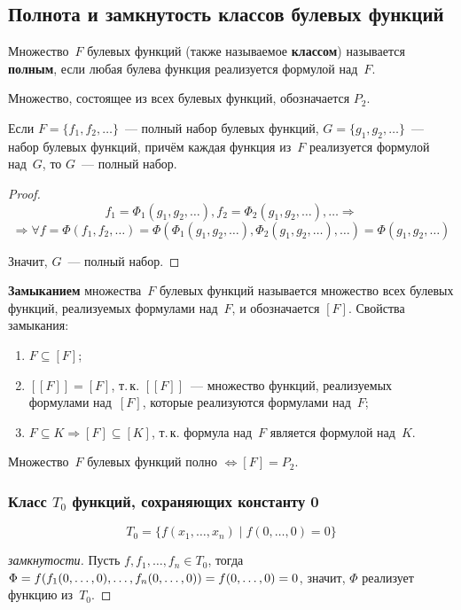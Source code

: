 \subsection{Полнота и замкнутость классов булевых функций}
Множество~$F$ булевых функций (также называемое \textbf{классом}) называется \textbf{полным}, если любая булева функция реализуется формулой над~$F$.

Множество, состоящее из всех булевых функций, обозначается $P_2$.

\begin{theorem}
Если $F = \{ f_1, f_2, \ldots \}$~--- полный набор булевых функций, $G = \{ g_1, g_2, \ldots \}$~--- набор булевых функций, причём каждая функция из~$F$ реализуется формулой над~$G$, то $G$~--- полный набор.
\end{theorem}
\begin{proof}
\begin{equation*}
f_1 = \Phi_1(g_1, g_2, \ldots), f_2 = \Phi_2(g_1, g_2, \ldots), \ldots \Rightarrow
\end{equation*}
\begin{equation*}
\Rightarrow \forall f = \Phi(f_1, f_2, \ldots) =
\Phi(\Phi_1(g_1, g_2, \ldots), \Phi_2(g_1, g_2, \ldots), \ldots) =
\Phi(g_1, g_2, \ldots)
\end{equation*}

Значит, $G$~--- полный набор.
\end{proof}

 \textbf{Замыканием} множества~$F$ булевых функций называется множество всех булевых функций, реализуемых формулами над~$F$, и обозначается $[F]$.
Свойства замыкания:
\begin{enumerate}
	\item $F \subseteq [F]$;
	\item $[[F]] = [F]$, т.\,к. $[[F]]$~--- множество функций, реализуемых формулами над~$[F]$, которые реализуются формулами над~$F$;
	\item $F \subseteq K \Rightarrow [F] \subseteq [K]$, т.\,к. формула над~$F$ является формулой над~$K$.
\end{enumerate}

\begin{statement}
Множество~$F$ булевых функций полно $\Leftrightarrow [F] = P_2$.
\end{statement}

\subsubsection{Класс \texorpdfstring{$T_0$}{} функций, сохраняющих константу 0}
\begin{equation*}
T_0 = \{ f(x_1, \ldots, x_n) \mid f(0, \ldots, 0) = 0 \}
\end{equation*}
\begin{proof}[замкнутости]
Пусть $f, f_1, \ldots, f_n \in T_0$, тогда $\Phi =
f(f_1(0, \ldots, 0), \ldots, f_n(0, \ldots, 0)) \opbr=
f(0, \ldots, 0) \opbr= 0$, значит, $\Phi$ реализует функцию из~$T_0$.
\end{proof}

